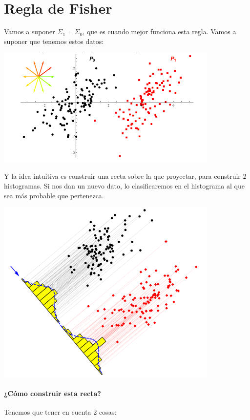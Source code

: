 \section{Regla de Fisher}

Vamos a suponer $Σ_1 = Σ_0$, que es cuando mejor funciona esta regla. Vamos a suponer que tenemos estos datos:

\begin{center}
\includegraphics[width=11cm]{img/ReglaFisherIntro.png}
\end{center}


Y la idea intuitiva es construir una recta sobre la que proyectar, para construir 2 histogramas. Si nos dan un nuevo dato, lo clasificaremos en el histograma al que sea más probable que pertenezca.

\begin{center}
\includegraphics[width=11cm]{img/ReglaFisherIntuitiva.png}
\end{center}


\paragraph{¿Cómo construir esta recta?} Tenemos que tener en cuenta 2 cosas:


